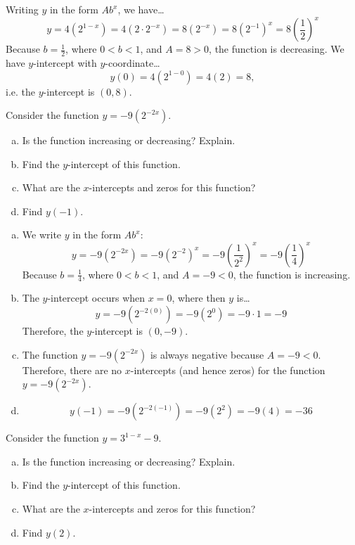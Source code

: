 \documentclass[11pt,letterpaper]{article}
\begin{document}
Writing $y$ in the form $Ab^x$, we have\dots
	\[
	y= 4(2^{1 - x})= 4(2 \cdot 2^{-x})= 8 (2^{-x})= 8(2^{-1})^x= 8 \left( \dfrac{1}{2} \right)^x
	\] 
Because $b= \frac{1}{2}$, where $0 < b < 1$, and $A= 8 > 0$, the function is decreasing. We have $y$-intercept with $y$-coordinate\dots
	\[
	y(0)= 4(2^{1 - 0})= 4(2)= 8,
	\]
i.e. the $y$-intercept is $(0, 8)$. 





\newpage





 Consider the function $y= -9 (2^{-2x})$.
\begin{enumerate}[(a)]
\item Is the function increasing or decreasing? Explain.
\item Find the $y$-intercept of this function.
\item What are the $x$-intercepts and zeros for this function?
\item Find $y(-1)$. 
\end{enumerate} \pspace

\sol
\begin{enumerate}[(a)]
\item We write $y$ in the form $Ab^x$:
	\[
	y= -9(2^{-2x})= -9(2^{-2})^x= -9 \left( \dfrac{1}{2^2} \right)^x= -9 \left( \dfrac{1}{4} \right)^x
	\]
Because $b= \frac{1}{4}$, where $0 < b < 1$, and $A= -9 < 0$, the function is increasing. \pspace

\item The $y$-intercept occurs when $x= 0$, where then $y$ is\dots
	\[
	y= -9(2^{-2(0)})= -9( 2^0)= -9 \cdot 1= -9
	\]
Therefore, the $y$-intercept is $(0, -9)$. \pspace

\item The function $y= -9(2^{-2x})$ is always negative because $A= -9 < 0$. Therefore, there are no $x$-intercepts (and hence zeros) for the function $y= -9(2^{-2x})$. \pspace

\item 
	\[
	y(-1)= -9(2^{-2(-1)})= -9(2^2)= -9(4)= -36
	\]
\end{enumerate}





\newpage





 Consider the function $y= 3^{1-x} - 9$.
\begin{enumerate}[(a)]
\item Is the function increasing or decreasing? Explain.
\item Find the $y$-intercept of this function.
\item What are the $x$-intercepts and zeros for this function?
\item Find $y(2)$. 
\end{enumerate} \pspace
\end{document}
